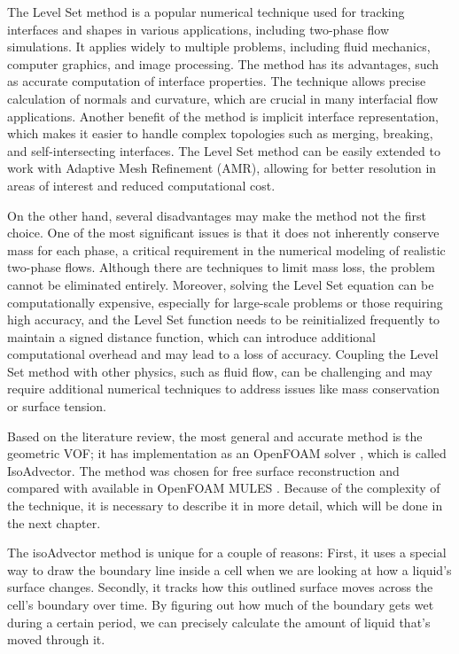 The Level Set method is a popular numerical technique used for tracking interfaces and shapes in various applications, including two-phase flow simulations. It applies widely to multiple problems, including fluid mechanics, computer graphics, and image processing. The method has its advantages, such as accurate computation of interface properties. The technique allows precise calculation of normals and curvature, which are crucial in many interfacial flow applications. Another benefit of the method is implicit interface representation, which makes it easier to handle complex topologies such as merging, breaking, and self-intersecting interfaces. The Level Set method can be easily extended to work with Adaptive Mesh Refinement (AMR), allowing for better resolution in areas of interest and reduced computational cost.

On the other hand, several disadvantages may make the method not the first choice. One of the most significant issues is that it does not inherently conserve mass for each phase, a critical requirement in the numerical modeling of realistic two-phase flows. Although there are techniques to limit mass loss, the problem cannot be eliminated entirely. Moreover, solving the Level Set equation can be computationally expensive, especially for large-scale problems or those requiring high accuracy, and the Level Set function needs to be reinitialized frequently to maintain a signed distance function, which can introduce additional computational overhead and may lead to a loss of accuracy. Coupling the Level Set method with other physics, such as fluid flow, can be challenging and may require additional numerical techniques to address issues like mass conservation or surface tension.

Based on the literature review, the most general and accurate method is the geometric VOF; it has implementation as an OpenFOAM solver \cite{roenby2019isoadvector}, which is called IsoAdvector. The method was chosen for free surface reconstruction and compared with available in OpenFOAM MULES \cite{MULES}. Because of the complexity of the technique, it is necessary to describe it in more detail, which will be done in the next chapter.

The isoAdvector method is unique for a couple of reasons: First, it uses a special way to draw the boundary line inside a cell when we are looking at how a liquid's surface changes. Secondly, it tracks how this outlined surface moves across the cell's boundary over time. By figuring out how much of the boundary gets wet during a certain period, we can precisely calculate the amount of liquid that's moved through it.

